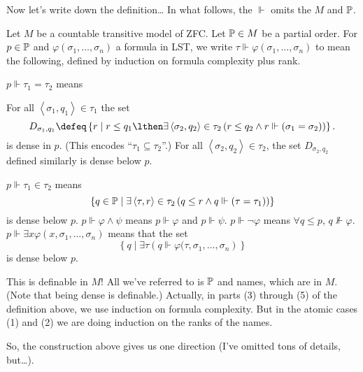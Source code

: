 Now let's write down the definition\dots
In what follows, the $\Vdash$ omits the $M$ and $\mathbb P$.
\begin{definition}
	Let $M$ be a countable transitive model of ZFC.
	Let $\mathbb P \in M$ be a partial order.
	For $p \in \mathbb P$ and $\varphi(\sigma_1, \dots, \sigma_n)$ a formula in LST, we write $\tau \Vdash \varphi(\sigma_1, \dots, \sigma_n)$ to mean the following, defined by induction on formula complexity plus rank.
	\begin{enumerate}[(1)]
		\ii $p \Vdash \tau_1 = \tau_2$ means
		\begin{enumerate}[(i)]
			\ii For all $\left<\sigma_1, q_1\right> \in \tau_1$ the set
			\[ D_{\sigma_1, q_1}
				\defeq
				\left\{ r \mid
				r \le q_1 \lthen \exists \left<\sigma_2, q_2\right> \in \tau_2 \left( r \le q_2 \land r \Vdash (\sigma_1 = \sigma_2) \right)\right\}.
			\]
			is dense in $p$.
			(This encodes ``$\tau_1 \subseteq \tau_2$''.)
			\ii For all $\left<\sigma_2, q_2\right> \in \tau_2$,
			the set $D_{\sigma_2, q_2}$ defined similarly is dense below $p$.
		\end{enumerate}
		\ii $p \Vdash \tau_1 \in \tau_2$ means
		\[
		\left\{ q \in \mathbb P
		\mid \exists \left<\tau, r\right> \in \tau_2 
		\left( q \le r \land q \Vdash(\tau=\tau_1) \right)
		\right\} \]
		is dense below $p$.
		\ii $p \Vdash \varphi \land \psi$ means $p \Vdash \varphi$ and $p \Vdash \psi$.
		\ii $p \Vdash \neg \varphi$ means $\forall q \le p$, $q \not\Vdash \varphi$.
		\ii $p \Vdash \exists x \varphi(x, \sigma_1, \dots, \sigma_n)$ means that the set
		\[
			\left\{ q \mid \exists \tau
				\left( q \Vdash \varphi(\tau, \sigma_1, \dots, \sigma_n \right)
			\right\}
		\]
		is dense below $p$.
	\end{enumerate}
\end{definition}
This is definable in $M$!
All we've referred to is $\mathbb P$ and names, which are in $M$.
(Note that being dense is definable.)
Actually, in parts (3) through (5) of the definition above,
we use induction on formula complexity.
But in the atomic cases (1) and (2) we are doing induction on the ranks of the names.

So, the construction above gives us one direction (I've omitted tons of details, but\dots).

